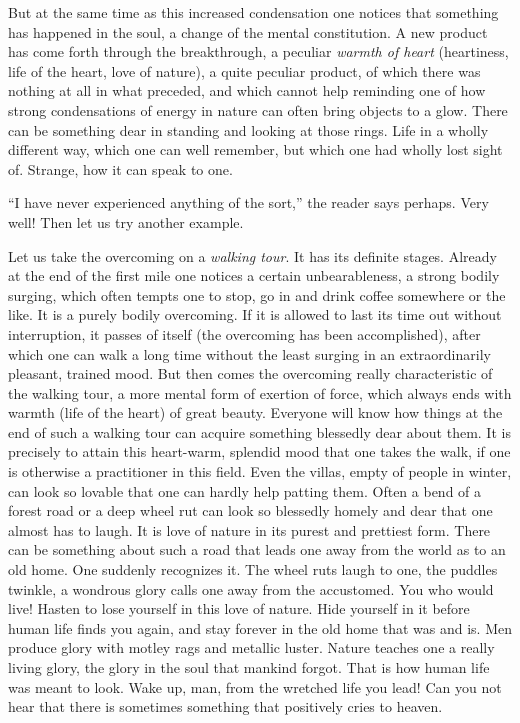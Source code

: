 \documentclass[12pt,a4paper,openany]{book}
\newcommand{\opage}[1]{\marginnote{\footnotesize\textit{[#1]}}}
\begin{document}
But at the same time as this increased condensation one notices
that something has happened in the soul, a change of the mental
constitution. A new product has come forth through the breakthrough, a peculiar \emph{warmth of heart} (heartiness, life of the heart,
love of nature), a quite peculiar product, of which there was
nothing at all in what preceded, and which cannot help
reminding one of how strong condensations of energy in
nature can often bring objects to a glow. There can be
something dear in standing and looking at those rings. Life in a wholly different
way, which one can well remember, but which one had wholly
lost sight of. Strange, how it can speak to one.

``I have never experienced anything of the sort,'' the reader says
perhaps. Very well! Then let us try another example.

Let us take the overcoming on a \emph{walking tour}. It has its
definite stages. Already at the end of the first mile
one notices a certain unbearableness, a strong bodily
surging, which often tempts one to stop, go in and drink
coffee somewhere or the like. It is a purely bodily overcoming. If
it is allowed to last its time out without interruption, it passes
of itself (the overcoming has been accomplished), after which one can walk
a long time without the least surging in an extraordinarily pleasant,
trained mood. But then comes the overcoming really characteristic
of the walking tour, a more mental form of
exertion of force, which always ends with warmth (life of the heart) of
great beauty. Everyone will know how things at the end
of such a walking tour can acquire something blessedly dear
about them. It is precisely to attain this heart-warm, splendid
mood that one takes the walk, if one is otherwise a practitioner
in this field. Even the villas, empty of people in winter,
\setcounter{footnote}{0}%
\opage{298}can look so lovable that one can hardly
help patting them. Often a bend of a forest road
or a deep wheel rut can look so blessedly homely and dear that one
almost has to laugh. It is love of nature in its purest and prettiest
form. There can be something about such a road that
leads one away from the world as to an old home. One suddenly
recognizes it. The wheel ruts laugh to one, the puddles
twinkle, a wondrous glory calls one away from the accustomed.
You who would live! Hasten to lose yourself in this love of nature.
Hide yourself in it before human life finds you
again, and stay forever in the old home that was and is. Men
produce glory with motley rags and metallic luster.
Nature teaches one a really living glory, the glory
in the soul that mankind forgot. That is how human life
was meant to look. Wake up, man, from the wretched life
you lead! Can you not hear that there is sometimes something that
positively cries to heaven.
\end{document}
